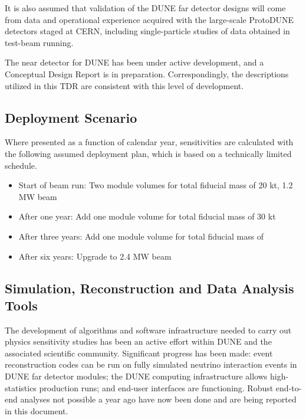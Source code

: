 It is also assumed that validation of the DUNE far detector 
designs will come from data and operational experience acquired 
with the large-scale ProtoDUNE detectors staged at CERN, 
including single-particle studies of data obtained 
in test-beam running.  

The near detector for DUNE has been under active development,
and a Conceptual Design Report is in preparation.
Correspondingly, the descriptions utilized in this TDR
are consistent with this level of development.  

\subsection{Deployment Scenario}
\label{sec:exec-phys-assm-meth-deployment}

Where presented as a function of calendar year,
sensitivities are calculated with the following
assumed deployment plan, which is based on a
technically limited schedule.
\begin{itemize}
    \item Start of beam run: Two  module %
    volumes for total fiducial mass of 20 kt, 1.2 MW beam
    \item After one year: Add one  module  volume for total fiducial mass of 30 kt
    \item After three years: Add one  module  volume for total fiducial mass of \fdfiducialmass
    \item After six years: Upgrade to 2.4 MW beam
\end{itemize}


\subsection{Simulation, Reconstruction and Data Analysis Tools}
\label{sec:exec-phys-assm-meth-simreco}

The development of algorithms and software infrastructure needed
to carry out physics sensitivity studies has been an active 
effort within DUNE and the associated scientific community.  
Significant progress has been made: event reconstruction 
codes can be run on fully simulated neutrino interaction events 
in DUNE far detector modules; the DUNE computing infrastructure 
allows high-statistics production runs; and end-user interfaces 
are functioning.  Robust end-to-end analyses not 
possible a year ago have now been done and are being 
reported in this document.

